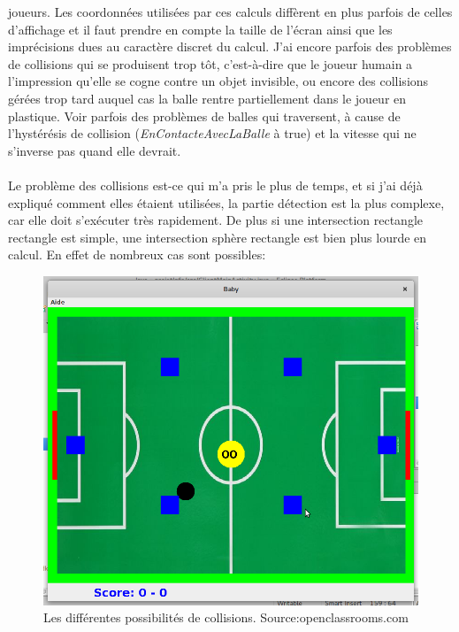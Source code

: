 \documentclass[a4paper,12pt]{report}
\begin{document}
joueurs. Les coordonnées utilisées par ces calculs diffèrent en plus parfois de celles d'affichage et il faut prendre en compte la taille de l'écran ainsi que les imprécisions dues au caractère discret du calcul. J'ai encore parfois des problèmes de collisions qui se produisent trop tôt, c'est-à-dire que le joueur humain a l'impression qu'elle se cogne contre un objet invisible, ou encore des collisions gérées trop tard auquel cas la balle rentre partiellement dans le joueur en plastique. Voir parfois des problèmes de balles qui traversent, à cause de l'hystérésis de collision (\emph{EnContacteAvecLaBalle} à true) et la vitesse qui ne s'inverse pas quand elle devrait.

\paragraph{}

Le problème des collisions est-ce qui m'a pris le plus de temps, et si j'ai déjà expliqué comment elles étaient utilisées, la partie détection est la plus complexe, car elle doit s'exécuter très rapidement. De plus si une intersection rectangle rectangle est simple, une intersection sphère rectangle est bien plus lourde en calcul. En effet de nombreux cas sont possibles:

\begin{figure}[H]

\begin{center}

\includegraphics[width=15cm]{pictures/header.jpg}

\end{center}

\caption{Les différentes possibilités de collisions. Source:openclassrooms.com}

\end{figure}
\end{document}
